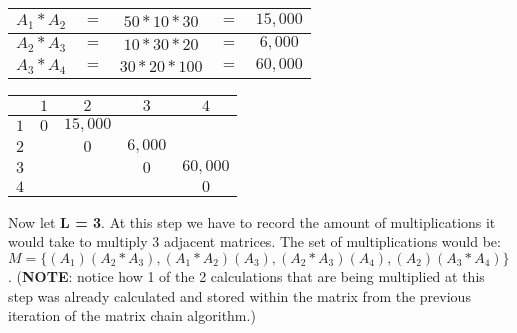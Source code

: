\documentclass{article}
\begin{document}
\begin{center}
	\begin{tabular}{| c c c c c |}
		\hline
		$A_{1} * A_{2}$ &$=$ &$50 * 10 * 30$ &$=$ &$15,000$\\
		\hline		
		$A_{2} * A_{3}$ &$=$ &$10 * 30 * 20$ &$=$ &$6,000$ \\
		\hline
		$A_{3} * A_{4}$ &$=$ &$30 * 20 * 100$ &$=$ &$60,000$\\ 
		\hline	
	
	\end{tabular}
\end{center}
\begin{center}

	\begin{tabular}{c | c | c | c | c}
	
		&$1$ &$2$ &$3$ &$4$ \\
		\hline
		$1$ &$0$ &$15,000$ & &\\
		\hline
		$2$ & &$0$ &$6,000$ &\\
		\hline
		$3$ & & &$0$ &$60,000$\\
		\hline
		$4$ & & & &$0$\\
		
	\end{tabular}
\end{center}

Now let \textbf{L = 3}. At this step we have to record the amount of multiplications it would take to multiply 3 adjacent matrices. The set of multiplications would be: $M = \{(A_{1})(A_{2} * A_{3}), (A_{1} *A_{2})(A_{3}), (A_{2} * A_{3})(A_{4}), (A_{2})(A_{3} * A_{4})\}$. (\textbf{NOTE}: notice how 1 of the 2 calculations that are being multiplied at this step was already calculated and stored within the matrix from the previous iteration of the matrix chain algorithm.)
\end{document}
